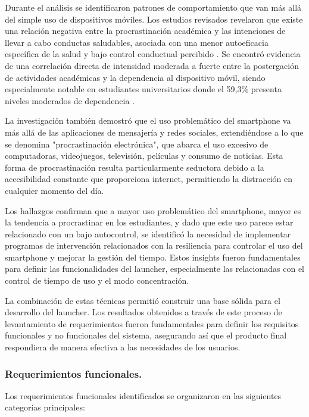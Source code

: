 Durante el análisis se identificaron patrones de comportamiento que van más allá del simple uso de dispositivos móviles. Los estudios revisados revelaron que existe una relación negativa entre la procrastinación académica y las intenciones de llevar a cabo conductas saludables, asociada con una menor autoeficacia específica de la salud y bajo control conductual percibido \cite{Vanguardia2012}. Se encontró evidencia de una correlación directa de intensidad moderada a fuerte entre la postergación de actividades académicas y la dependencia al dispositivo móvil, siendo especialmente notable en estudiantes universitarios donde el 59,3\% presenta niveles moderados de dependencia \cite{Villagomez2023}.

La investigación también demostró que el uso problemático del smartphone va más allá de las aplicaciones de mensajería y redes sociales, extendiéndose a lo que se denomina "procrastinación electrónica", que abarca el uso excesivo de computadoras, videojuegos, televisión, películas y consumo de noticias. Esta forma de procrastinación resulta particularmente seductora debido a la accesibilidad constante que proporciona internet, permitiendo la distracción en cualquier momento del día.

Los hallazgos confirman que a mayor uso problemático del smartphone, mayor es la tendencia a procrastinar en los estudiantes, y dado que este uso parece estar relacionado con un bajo autocontrol, se identificó la necesidad de implementar programas de intervención relacionados con la resiliencia para controlar el uso del smartphone y mejorar la gestión del tiempo. Estos insights fueron fundamentales para definir las funcionalidades del launcher, especialmente las relacionadas con el control de tiempo de uso y el modo concentración.

La combinación de estas técnicas permitió construir una base sólida para el desarrollo del launcher. Los resultados obtenidos a través de este proceso de levantamiento de requerimientos fueron fundamentales para definir los requisitos funcionales y no funcionales del sistema, asegurando así que el producto final respondiera de manera efectiva a las necesidades de los usuarios.

\subsubsection{Requerimientos funcionales.}

Los requerimientos funcionales identificados se organizaron en las siguientes categorías principales:


